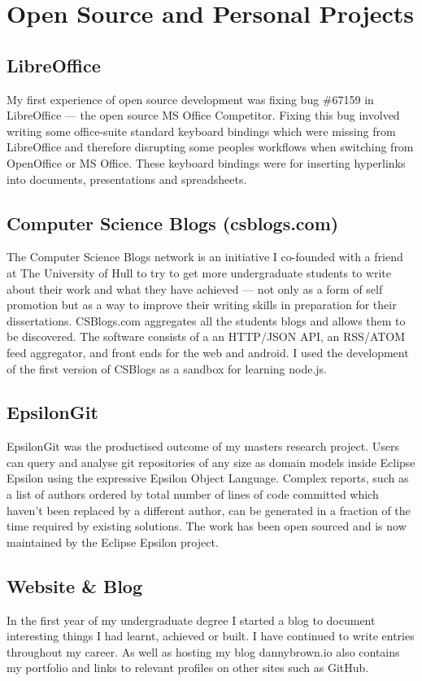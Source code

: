 \documentclass[10pt,letterpaper]{article}
\begin{document}
	\section*{Open Source and Personal Projects}
	\subsection*{LibreOffice}
	My first experience of open source development was fixing bug \#67159 in LibreOffice — the open source MS Office Competitor. Fixing this bug involved writing some office-suite standard keyboard bindings which were missing from LibreOffice and therefore disrupting some peoples workflows when switching from OpenOffice or MS Office. These keyboard bindings were for inserting hyperlinks into documents, presentations and spreadsheets.
	\subsection*{Computer Science Blogs \small{(csblogs.com)}}
	The Computer Science Blogs network is an initiative I co-founded with a friend at The University of Hull to try to get more undergraduate students to write about their work and what they have achieved — not only as a form of self promotion but as a way to improve their writing skills in preparation for their dissertations. CSBlogs.com aggregates all the students blogs and allows them to be discovered. The software consists of a an HTTP/JSON API, an RSS/ATOM feed aggregator, and front ends for the web and android. I used the development of the first version of CSBlogs as a sandbox for learning node.js.
	
	\subsection*{EpsilonGit}
	EpsilonGit was the productised outcome of my masters research project. Users can query and analyse git repositories of any size as domain models inside Eclipse Epsilon using the expressive Epsilon Object Language. Complex reports, such as a list of authors ordered by total number of lines of code committed which haven’t been replaced by a different author, can be generated in a fraction of the time required by existing solutions. The work has been open sourced and is now maintained by the Eclipse Epsilon project. 

	\subsection*{Website \& Blog}
	In the first year of my undergraduate degree I started a blog to document interesting things I had learnt, achieved or built. I have continued to write entries throughout my career. As well as hosting my blog dannybrown.io also contains my portfolio and links to relevant profiles on other sites such as GitHub.
	
\end{document}

